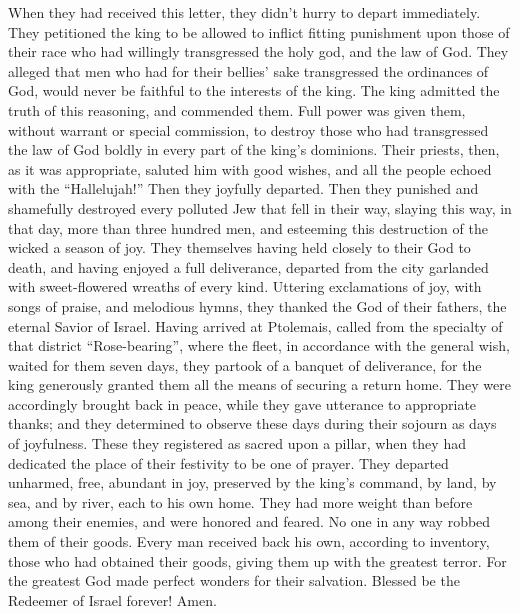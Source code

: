  When they had received this letter, they didn't hurry to
depart immediately. They petitioned the king to be allowed to inflict
fitting punishment upon those of their race who had willingly
transgressed the holy god, and the law of God.  They
alleged that men who had for their bellies' sake transgressed the
ordinances of God, would never be faithful to the interests of the king.
 The king admitted the truth of this reasoning, and
commended them. Full power was given them, without warrant or special
commission, to destroy those who had transgressed the law of God boldly
in every part of the king's dominions.  Their priests,
then, as it was appropriate, saluted him with good wishes, and all the
people echoed with the ``Hallelujah!'' Then they joyfully departed.
 Then they punished and shamefully destroyed every
polluted Jew that fell in their way,  slaying this way,
in that day, more than three hundred men, and esteeming this destruction
of the wicked a season of joy.  They themselves having
held closely to their God to death, and having enjoyed a full
deliverance, departed from the city garlanded with sweet-flowered
wreaths of every kind. Uttering exclamations of joy, with songs of
praise, and melodious hymns, they thanked the God of their fathers, the
eternal Savior of Israel.  Having arrived at Ptolemais,
called from the specialty of that district ``Rose-bearing'', where the
fleet, in accordance with the general wish, waited for them seven days,
 they partook of a banquet of deliverance, for the king
generously granted them all the means of securing a return home.
 They were accordingly brought back in peace, while they
gave utterance to appropriate thanks; and they determined to observe
these days during their sojourn as days of joyfulness. 
These they registered as sacred upon a pillar, when they had dedicated
the place of their festivity to be one of prayer. They departed
unharmed, free, abundant in joy, preserved by the king's command, by
land, by sea, and by river, each to his own home.  They
had more weight than before among their enemies, and were honored and
feared. No one in any way robbed them of their goods. 
Every man received back his own, according to inventory, those who had
obtained their goods, giving them up with the greatest terror. For the
greatest God made perfect wonders for their salvation. 
Blessed be the Redeemer of Israel forever! Amen.
